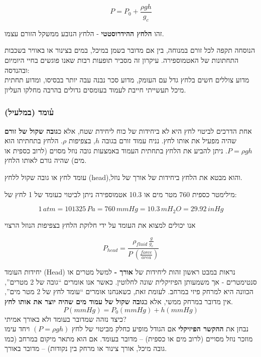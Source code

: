 \documentclass[
  hebrew,
  letterpaper,
  DIV=11,
  numbers=noendperiod]{scrreprt}
\begin{document}
\[
P = P_{0} + \frac{\rho g h}{g_{c}}
\]

זהו \textbf{הלחץ ההידרוסטטי} - הלחץ הנובע ממשקל הזורם עצמו.

{הנוסחה תקפה לכל זורם במנוחה, בין אם מדובר בשמן במיכל, במים בצינור או
באוויר בשכבות התחתונות של האטמוספירה}. {עיקרון זה מסביר תופעות רבות שאנו
פוגשים בחיי היומיום ובהנדסה}:\\
{מדוע צוללים חשים בלחץ גדל עם העומק, מדוע סכר נבנה עבה יותר בבסיסו,
ומדוע תחתית מיכל תעשייתי חייבת לעמוד בעומסים גדולים בהרבה מחלקו העליון}.

\subsubsection{\texorpdfstring{{ע֫ומד
(במלעיל)}}{ע֫ומד (במלעיל)}}\label{ux5e2ux5d5ux5deux5d3-ux5d1ux5deux5dcux5e2ux5d9ux5dc}

אחת הדרכים לביטוי לחץ היא לא ביחידות של כוח ליחידת שטח, אלא
כ\textbf{גובה שקול של זורם} שהיה מפעיל את אותו לחץ. נניח עמוד זורם בגובה
\(h\), בצפיפות \(\rho\). הלחץ בתחתיתו הוא \(P = \rho g h\). ניתן להביע
את הלחץ בתחתית העמוד באמצעות גובה נוזל מסוים (לרוב כספית או מים) שהיה
גורם לאותו הלחץ.

{{עומד לחץ} או {גובה שקול ללחץ (}}{head{),}}{והוא מבטא את הלחץ ביחידות
של אורך של נוזל.}

לחץ של ‎1‎ אטמוספירה ניתן לביטוי כעומד של ‎10.3‎ מטר מים או ‎760‎ מילימטר
כספית:

\[
1\,atm = 101325\,Pa = 760\,mmHg = 10.3\,mH_{2}O = 29.92\,inHg
\]

{אנו יכולים למצוא את העומד על ידי חלוקת הלחץ בצפיפות הנוזל הרצוי}

\[P_{head} = \frac{\rho_{fluid\ }\frac{g}{g_{c}}}{P\ \left( \frac{force}{area} \right)}\]

\begin{tcolorbox}[enhanced jigsaw, colback=white, arc=.35mm, coltitle=black, breakable, toptitle=1mm, leftrule=.75mm, colbacktitle=quarto-callout-note-color!10!white, opacitybacktitle=0.6, bottomtitle=1mm, titlerule=0mm, opacityback=0, colframe=quarto-callout-note-color-frame, title=\textcolor{quarto-callout-note-color}{\faInfo}\hspace{0.5em}{הערה}, rightrule=.15mm, bottomrule=.15mm, toprule=.15mm, left=2mm]

{יחידות העומד} (Head) {נראות במבט ראשון זהות ליחידות של \textbf{אורך -}
למשל מטרים או סנטימטרים - אך משמעותן הפיזיקלית שונה לחלוטין}. {כאשר אנו
אומרים ``גובה של 2 מטרים'', הכוונה היא למרחק פיזי במרחב}. {לעומת זאת,
כשאנחנו אומרים ``עומד לחץ של 2 מטר מים'', אין מדובר במרחק ממשי, אלא
ב\textbf{גובה שקול של עמוד מים שהיה יוצר את אותו לחץ}}.
\[P(mmHg) = P_{0}(mmHg) + h(mmHg)\] {כיצד נזהה שמדובר בעומד ולא באורך
אמיתי}?\\
{נבחן את \textbf{ההקשר הפיזיקלי} אם הגודל מופיע כחלק מביטוי של לחץ}
\((P = \rho gh)\) {ויחד עימו מוזכר נוזל מסויים (לרוב מים או כספית) --
מדובר בעומד}. {אם הוא מתאר מיקום במרחב (כמו גובה מיכל, אורך צינור או
מרחק בין נקודות) -- מדובר באורך}.

\end{tcolorbox}
\end{document}
